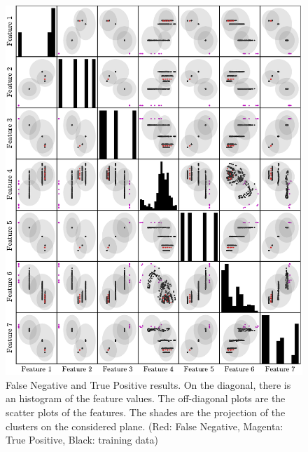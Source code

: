 \begin{figure}
    \centering
    \includegraphics{Images/shaker/ConfusionMatrix.pdf}
    \caption{False Negative and True Positive results. On the diagonal, there is an histogram of the feature values. The off-diagonal plots are the scatter plots of the features. The shades are the projection of the clusters on the considered plane. (Red: False Negative, Magenta: True Positive, Black: training data)}
    \label{fig:shaker_conf_matrix}
    \end{figure}